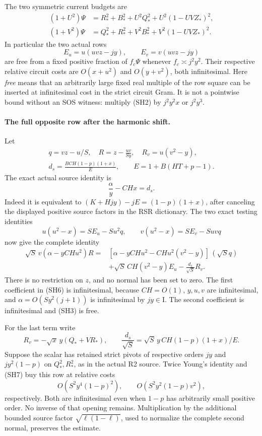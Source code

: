 The two symmetric current budgets are
\[
\begin{split}
 (1+U^2)\Psi&=R_*^2+B_*^2+U^2Q_*^2
                         +U^2(1-UVZ_*)^2,\\
 (1+V^2)\Psi&=Q_*^2+R_*^2+V^2B_*^2
                         +V^2(1-UVZ_*)^2 .
\end{split}                                                     \tag{SH2}
\]
In particular the two actual rows
\[
 E_u=u(uvz-jy),\qquad E_v=v(uvz-jy)                       \tag{SH3}
\]
are free from a fixed positive fraction of \(f_c\Psi\) whenever
\(f_c\asymp j^2y^2\).  Their respective relative circuit costs
are \(O(x+u^2)\) and \(O(y+v^2)\), both infinitesimal.  Here
\emph{free} means that an arbitrarily large fixed real multiple of
the row square can be inserted at infinitesimal cost in the
strict circuit Gram.  It is not a pointwise bound without an
SOS witness: multiply (SH2) by \(j^2y^2x\) or \(j^2y^3\).

\paragraph{The full opposite row after the harmonic shift.}
Let
\[
 \begin{gathered}
 q=vz-u/S,\quad R=z-\frac{uv}{Sy},\quad R_v=u(v^2-y),\\
 d_s=\frac{BCH(1-p)(1+x)}{E},\qquad E=1+B(HT+p-1).
 \end{gathered}
\]
The exact actual source identity is
\[
                 \frac{\alpha}{y}-CHx=d_s.             \tag{SH4}
\]
Indeed it is equivalent to
\((K+Hjy)-jE=(1-p)(1+x)\), after canceling the displayed
positive source factors in the RSR dictionary.
The two exact testing identities
\[
 u(u^2-x)=S E_u-Su^2q,\qquad
 v(u^2-x)=S E_v-Suvq                                  \tag{SH5}
\]
now give the complete identity
\[
\begin{split}
 \sqrt S\,v(\alpha-yCHu^2)R
 ={}&[\alpha-yCHu^2-CHu^2(v^2-y)]\,(\sqrt S q)\\
 &+\sqrt S\,CH(v^2-y)E_u-\frac{d_s}{\sqrt S}R_v .
\end{split}                                                     \tag{SH6}
\]
There is no restriction on \(z\), and no normal has been set to
zero.  The first coefficient in (SH6) is infinitesimal, because
\(CH=O(1)\), \(y,u,v\) are infinitesimal, and
\(\alpha=O(Sy^2(j+1))\) is infinitesimal by \(jy\in\mathrm I\).
The second coefficient is infinitesimal and (SH3) is free.

For the last term write
\[
 R_v=-\sqrt x\,y(Q_*+VR_*),\qquad
 \frac{d_s}{\sqrt S}
   =\sqrt S\,y\,CH(1-p)(1+x)/E.                         \tag{SH7}
\]
Suppose the scalar has retained strict pivots of respective orders
\(jy\) and \(jy^2(1-p)\) on \(Q_*^2,R_*^2\), as in the actual
R2 source.  Twice Young's identity and (SH7) buy this row at
relative costs
\[
 O(S^2y^4(1-p)^2),\qquad
 O(S^2y^2(1-p)v^2),                                   \tag{SH8}
\]
respectively.  Both are infinitesimal even when \(1-p\) has
arbitrarily small positive order.  No inverse of that opening
remains.  Multiplication by the additional bounded source
factor \(\sqrt{\ell(1-\ell)}\), used to normalize the complete
second normal, preserves the estimate.

